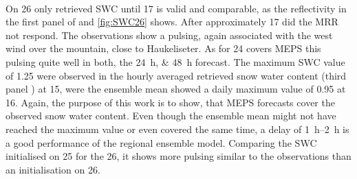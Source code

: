 \\
On \SI{26}{\dec} only retrieved SWC until \SI{17}{\UTC} is valid and comparable, as the reflectivity in the first panel of  and \ref{fig:SWC26} shows. After approximately \SI{17}{\UTC} did the MRR not respond. 
The observations show a pulsing, again associated with the west wind over the mountain, close to Haukeliseter. As for \SI{24}{\dec} covers MEPS this pulsing quite well in both, the \SIlist{24;48}{\hour} forecast. The maximum SWC value of \SI{1.25}{\SWC} were observed in the hourly averaged retrieved snow water content (third panel ) at \SI{15}{\UTC}, were the ensemble mean showed a daily maximum value of \SI{0.95}{\SWC} at \SI{16}{\UTC}. Again, the purpose of this work is to show, that MEPS forecasts cover the observed snow water content. Even though the ensemble mean might not have reached the maximum value or even covered the same time, a delay of \SIrange{1}{2}{\hour} is a good performance of the regional ensemble model. Comparing the SWC initialised on \SI{25}{\dec} for the \SI{26}{\dec}, it shows more pulsing similar to the observations than an initialisation on \SI{26}{\dec}.
